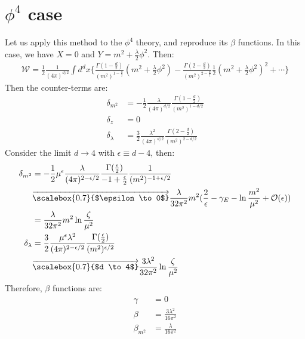 \documentclass[fleqn]{article}
\begin{document}
\section{$\phi^{4}$ case}
Let us apply this method to the $\phi^{4}$ theory, and reproduce its $\beta$ functions. In this case, we have $X = 0$ and $Y = m^{2} + \frac{\lambda}{2} \phi^{2}$. Then:
\begin{align}
\mathcal{W} = \frac{1}{2} \frac{1}{(4\pi)^{d/2}} \int d^{d}x \lbrace \frac{\Gamma(1-\frac{d}{2})}{(m^2)^{{1-\frac{d}{2}}}} (m^{2} + \frac{\lambda}{2}\phi ^{2} )- \frac{\Gamma(2-\frac{d}{2})}{(m^2)^{2-\frac{d}{2}}}\frac{1}{2}(m^{2} + \frac{\lambda}{2}\phi ^{2})^{2} + \cdots \rbrace
\end{align}
Then the counter-terms are:
\begin{align}
\delta _{m^2} &= -\frac{1}{2}\frac{\lambda}{(4\pi)^{d/2} }\frac{\Gamma (1-\frac{d}{2})}{(m^2)^{1-d/2}} \\
\delta _{z} &= 0 \\
\delta _{\lambda} &= \frac{3}{2} \frac{\lambda ^{2}}{(4\pi)^{d/2}} \frac{\Gamma(2-\frac{d}{2})}{(m^2)^{2-d/2}}
\end{align}
Consider the limit $d \rightarrow 4$ with $\epsilon \equiv d -4$, then:
\begin{align}
\delta _{m^{2}} & = -\frac{1}{2}\mu ^{\epsilon} \frac{\lambda}{(4\pi)^{2-\epsilon/2}} \frac{\Gamma(\frac{\epsilon}{2})}{-1+\frac{\epsilon}{2}}\frac{1}{(m^2)^{-1+\epsilon/2}} \nonumber \\
&\overrightarrow{\scalebox{0.7}{$\epsilon \to 0$}} \frac{\lambda}{32\pi ^{2}} m^{2} (\frac{2}{\epsilon} - \gamma _{E} -\ln\frac{m^{2}}{\mu^{2}} + \mathcal{O}(\epsilon)) \nonumber \\
& = \frac{\lambda}{32\pi ^{2}}m^{2} \ln \frac{\zeta}{\mu ^{2}} \\
\delta _{\lambda} & = \frac{3}{2} \frac{\mu ^{\epsilon} \lambda ^{2} }{(4\pi)^{2-\epsilon/2}} \frac{\Gamma(\frac{\epsilon}{2})}{(m^2)^{\epsilon /2}} \nonumber \\
&\overrightarrow{\scalebox{0.7}{$d \to 4$}} \frac{3\lambda^{2}}{32\pi^{2}} \ln \frac{\zeta}{\mu^{2} }
\end{align}
Therefore, $\beta$ functions are:
\begin{align}
\gamma &= 0 \\
\beta & = \frac{3\lambda^{2}}{16\pi ^{2}} \\
\beta_{m^{2}} &= \frac{\lambda}{16\pi^2}
\end{align}
\end{document}

